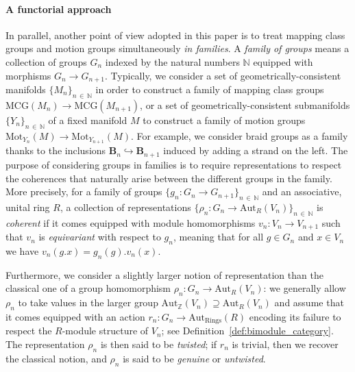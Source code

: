 \documentclass[AHL,Unicode,published]{cedram}
\newcommand{\Aut}{\mathrm{Aut}}
\newcommand{\MCG}{\mathrm{MCG}}
\newcommand{\Mot}{\mathrm{Mot}}
\newcommand{\Rings}{\ensuremath{\mathrm{Rings}}}
\newcommand{\B}{\ensuremath{\mathbf{B}}}
\newcommand{\bN}{\mathbb{N}}
\newcommand{\bZ}{\mathbb{Z}}
\begin{document}
\paragraph*{A functorial approach}
In parallel, another point of view adopted in this paper is to treat mapping class groups and motion groups simultaneously \emph{in families}. A \emph{family of groups} means a collection of groups $G_{n}$ indexed by the natural numbers $\bN$ equipped with morphisms $G_{n} \to G_{n+1}$. Typically, we consider a set of geometrically-consistent manifolds $\{M_{n}\}_{n\,\in\,\bN}$ in order to construct a family of mapping class groups $\MCG(M_{n})\to \MCG(M_{n+1})$, or a set of geometrically-consistent submanifolds $\{Y_{n}\}_{n\,\in\,\bN}$ of a fixed manifold $M$ to construct a family of motion groups $\Mot_{Y_{n}}(M)\to \Mot_{Y_{n+1}}(M)$. For example, we consider braid groups as a family thanks to the inclusions $\B_{n}\hookrightarrow \B_{n+1}$ induced by adding a strand on the left. The purpose of considering groups in families is to require representations to respect the coherences that naturally arise between the different groups in the family. More precisely, for a family of groups $\{g_{n} \colon G_{n} \to G_{n+1}\}_{n\,\in\,\bN}$ and an associative, unital ring $R$, a collection of representations $\{\rho_{n} \colon G_{n}\rightarrow \Aut_{R}(V_{n})\}_{n\,\in\,\bN}$ is \emph{coherent} if it comes equipped with module homomorphisms $v_{n} \colon V_{n} \to V_{n+1}$ such that $v_{n}$ is \emph{equivariant} with respect to $g_{n}$, meaning that for all $g \in G_{n}$ and $x \in V_{n}$ we have $v_{n}(g.x) = g_{n}(g).v_{n}(x)$.

Furthermore, we consider a slightly larger notion of representation than the classical one of a group homomorphism $\rho_{n} \colon G_{n}\rightarrow \Aut_{R}(V_{n})$: we generally allow $\rho_{n}$ to take values in the larger group $\Aut_{\bZ}(V_{n}) \supseteq \Aut_{R}(V_{n})$ and assume that it comes equipped with an action $r_{n}\colon G_{n}\rightarrow \Aut_{\Rings}(R)$ encoding its failure to respect the $R$-module structure of $V_n$; see Definition~\ref{def:bimodule_category}. The representation $\rho_{n}$ is then said to be \emph{twisted}; if $r_{n}$ is trivial, then we recover the classical notion, and $\rho_{n}$ is said to be \emph{genuine} or \emph{untwisted}.
\end{document}
